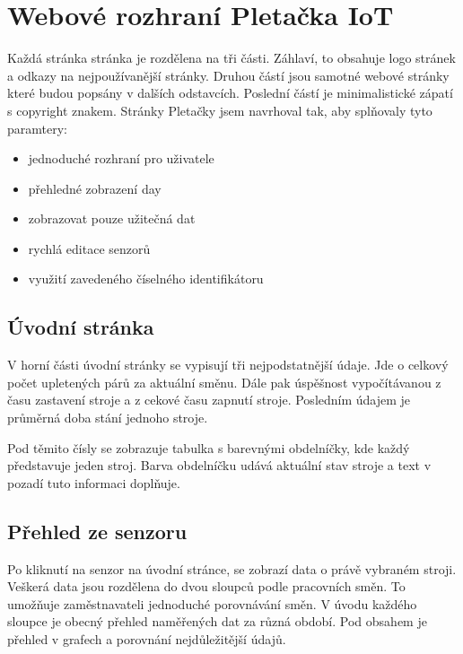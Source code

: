 \section{Webové rozhraní Pletačka IoT}
Každá stránka stránka je rozdělena na tři části. Záhlaví, to obsahuje logo stránek a odkazy na nejpoužívanější stránky.
Druhou částí jsou samotné webové stránky které budou popsány v dalších odstavcích.
Poslední částí je minimalistické zápatí s copyright znakem.\newline
Stránky Pletačky jsem navrhoval tak, aby splňovaly tyto paramtery:

\fxnote[author=JA]{\textcolor{mygreen}{Doplňit obrázky stránek pod kapitolu nebo jeden list s fotkama}}

\begin{itemize}
    \item jednoduché rozhraní pro uživatele
    \item přehledné zobrazení day
    \item zobrazovat pouze užitečná dat
    \item rychlá editace senzorů
    \item využití zavedeného číselného identifikátoru 
\end{itemize}

\subsection{Úvodní stránka}
V horní části úvodní stránky se vypisují tři nejpodstatnější údaje.
Jde o celkový počet upletených párů za aktuální směnu.
Dále pak úspěšnost vypočítávanou z času zastavení stroje a z cekové času zapnutí stroje.
Posledním údajem je průměrná doba stání jednoho stroje.   

Pod těmito čísly se zobrazuje tabulka s barevnými obdelníčky, kde každý představuje jeden stroj.
Barva obdelníčku udává aktuální stav stroje a text v pozadí tuto informaci doplňuje. 

\subsection{Přehled ze senzoru}
Po kliknutí na senzor na úvodní stránce, se zobrazí data o právě vybraném stroji.
Veškerá data jsou rozdělena do dvou sloupců podle pracovních směn.
To umožňuje zaměstnavateli jednoduché porovnávání směn.
V úvodu každého sloupce je obecný přehled naměřených dat za různá období.
Pod obsahem je přehled v grafech a porovnání nejdůležitější údajů.

